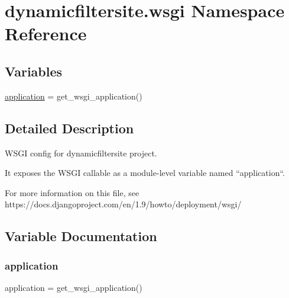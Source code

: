 \hypertarget{namespacedynamicfiltersite_1_1wsgi}{}\section{dynamicfiltersite.\+wsgi Namespace Reference}
\label{namespacedynamicfiltersite_1_1wsgi}
\subsection*{Variables}
\begin{DoxyCompactItemize}
\item 
\mbox{\hyperlink{namespacedynamicfiltersite_1_1wsgi_a9556574144704032c9e6bafa10276622}{application}} = get\+\_\+wsgi\+\_\+application()
\end{DoxyCompactItemize}


\subsection{Detailed Description}
\begin{DoxyVerb}WSGI config for dynamicfiltersite project.

It exposes the WSGI callable as a module-level variable named ``application``.

For more information on this file, see
https://docs.djangoproject.com/en/1.9/howto/deployment/wsgi/
\end{DoxyVerb}
 

\subsection{Variable Documentation}
\mbox{\label{namespacedynamicfiltersite_1_1wsgi_a9556574144704032c9e6bafa10276622}} 
\subsubsection{\texorpdfstring{application}{application}}
{\footnotesize\ttfamily application = get\+\_\+wsgi\+\_\+application()}

